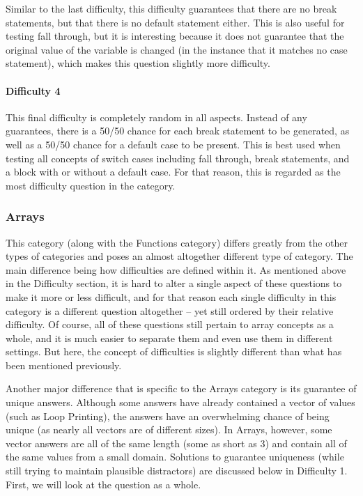 \documentclass{article}
\begin{document}
Similar to the last difficulty, this difficulty guarantees that there are no break statements, but that there is no default statement either. This is also useful for testing fall through, but it is 
interesting because it does not guarantee that the original value of the variable is changed (in the instance that it matches no case statement), which makes this question slightly more 
difficulty.

\paragraph{Difficulty 4} \hfill \par

This final difficulty is completely random in all aspects. Instead of any guarantees, there is a 50/50 chance for each break statement to be generated, as well as a 50/50 chance for a default 
case to be present. This is best used when testing all concepts of switch cases including fall through, break statements, and a block with or without a default case. For that reason, this is 
regarded as the most difficulty question in the category. 

\subsubsection{Arrays}

This category (along with the Functions category) differs greatly from the other types of categories and poses an almost altogether different type of category. The main difference being how difficulties are defined within it. As mentioned above in the Difficulty section, it is hard to alter a single aspect of these questions to make it more or less difficult, and
for that reason each single difficulty in this category is a different question altogether -- yet still ordered by their relative difficulty. Of course, all of these questions still pertain to array concepts
as a whole, and it is much easier to separate them and even use them in different settings. But here, the concept of difficulties is slightly different than what has been mentioned previously. 

Another major difference that is specific to the Arrays category is its guarantee of unique answers. Although some answers have already contained a vector of values (such as Loop Printing), 
the answers have an overwhelming chance of being unique (as nearly all vectors are of different sizes). In Arrays, however, some vector answers are all of the same length (some as short as 3) and contain all of the same values from a small domain. Solutions to guarantee uniqueness (while still trying to maintain plausible distractors) are discussed below in Difficulty 1. First, we will look
at the question as a whole.
\end{document}
